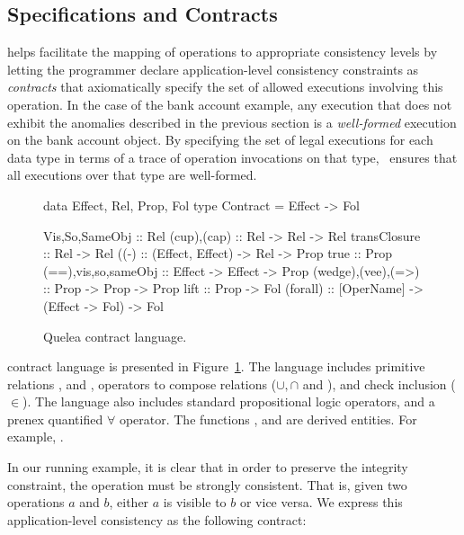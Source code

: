 \subsection{Specifications and Contracts}

\name helps facilitate the mapping of operations to appropriate consistency
levels by letting the programmer declare application-level consistency
constraints as \emph{contracts} that axiomatically specify the set of allowed
executions involving this operation.  In the case of the bank account example,
any execution that does not exhibit the anomalies described in the previous
section is a \emph{well-formed} execution on the bank account object.  By
specifying the set of legal executions for each data type in terms of a trace
of operation invocations on that type, \name\ ensures that all executions over
that type are well-formed.

\begin{figure}
\begin{codehaskell}
data Effect, Rel, Prop, Fol
type Contract = Effect -> Fol

Vis,So,SameObj :: Rel
(cup),(cap)        :: Rel -> Rel -> Rel
transClosure   :: Rel -> Rel
((-)            :: (Effect, Effect) -> Rel -> Prop
true           :: Prop
(==),vis,so,sameObj :: Effect -> Effect -> Prop
(wedge),(vee),(=>)   :: Prop -> Prop -> Prop
lift           :: Prop -> Fol
(forall) :: [OperName] -> (Effect -> Fol) -> Fol
\end{codehaskell}
\caption{Quelea contract language.}
\label{code:ctrt_lang}
\end{figure}

\name contract language is presented in Figure~\ref{code:ctrt_lang}. The
language includes primitive relations , and ,
operators to compose relations ($\cup,\cap$ and ), and check
inclusion ($\in$). The language also includes standard propositional logic
operators, and a prenex quantified $\forall$ operator. The functions ,
 and  are derived entities. For example, .

In our running example, it is clear that in order to preserve the integrity
constraint, the  operation must be strongly consistent. That is,
given two  operations $a$ and $b$, either $a$ is visible to $b$ or
vice versa. We express this application-level consistency as the following
contract:

